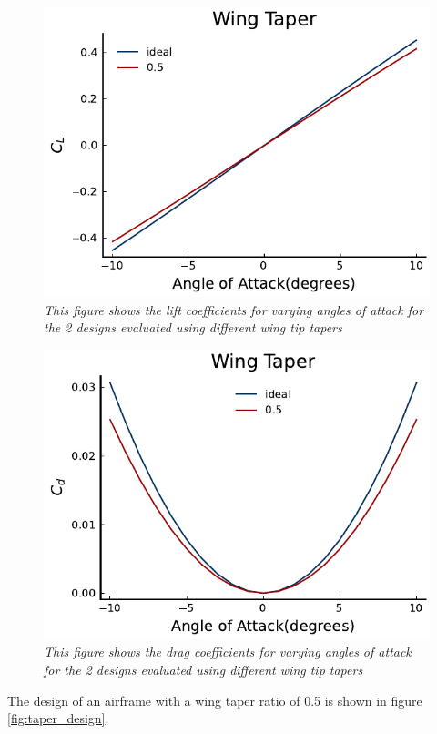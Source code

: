 \documentclass{journal}
\begin{document}
	\begin{figure}[H]
		\includegraphics{../graphics/taper_cl.pdf}
		\caption{\emph{This figure shows the lift coefficients for varying angles of attack for the 2 designs evaluated using different wing tip tapers}}
		\label{fig:taper_cl}
	\end{figure}
	\begin{figure}[H]
		\includegraphics{../graphics/taper_cd.pdf}
		\caption{\emph{This figure shows the drag coefficients for varying angles of attack for the 2 designs evaluated using different wing tip tapers}}
		\label{fig:taper_cd}
	\end{figure}

	The design of an airframe with a wing taper ratio of 0.5 is shown in figure \ref{fig:taper_design}.
	
\end{document}

